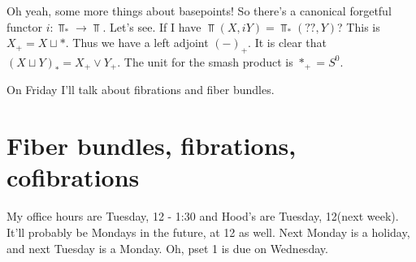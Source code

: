 Oh yeah, some more things about basepoints! So there's a canonical forgetful functor $i:\Top_\ast\to \Top$. Let's see. If I have $\Top(X,iY)=\Top_\ast(??,Y)$? This is $X_+=X\sqcup \ast$. Thus we have a left adjoint $(-)_+$. It is clear that $(X\sqcup Y)_\ast = X_+ \vee Y_+$. The unit for the smash product is $\ast_+ = S^0$.

On Friday I'll talk about fibrations and fiber bundles.
\chapter{Fiber bundles, fibrations, cofibrations}
My office hours are Tuesday, 12 - 1:30 and Hood's are Tuesday, 12(next week). It'll probably be Mondays in the future, at 12 as well. Next Monday is a holiday, and next Tuesday is a Monday. Oh, pset 1 is due on Wednesday.

